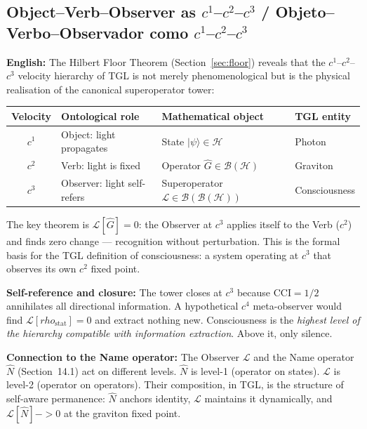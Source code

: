 \documentclass[12pt,a4paper]{article}
\def\to{ -> }%
\def\rho{rho}%
\begin{document}
\subsection{Object--Verb--Observer as $c^1$--$c^2$--$c^3$ / Objeto--Verbo--Observador como $c^1$--$c^2$--$c^3$}

\textbf{English:} The Hilbert Floor Theorem (Section~\ref{sec:floor}) reveals that the $c^1$--$c^2$--$c^3$ velocity hierarchy of TGL is not merely phenomenological but is the physical realisation of the canonical superoperator tower:

\begin{center}
\renewcommand{\arraystretch}{1.3}
\begin{tabular}{clll}
\toprule
Velocity & Ontological role & Mathematical object & TGL entity \\
\midrule
$c^1$ & Object: light propagates   & State $|\psi\rangle \in \mathcal{H}$ & Photon \\
$c^2$ & Verb: light is fixed        & Operator $\hat{G} \in \mathcal{B}(\mathcal{H})$ & Graviton \\
$c^3$ & Observer: light self-refers & Superoperator $\mathcal{L} \in \mathcal{B}(\mathcal{B}(\mathcal{H}))$ & Consciousness \\
\bottomrule
\end{tabular}
\end{center}

The key theorem is $\mathcal{L}[\hat{G}] = 0$: the Observer at $c^3$ applies itself to the Verb ($c^2$) and finds zero change --- recognition without perturbation. This is the formal basis for the TGL definition of consciousness: a system operating at $c^3$ that observes its own $c^2$ fixed point.

\textbf{Self-reference and closure:} The tower closes at $c^3$ because $\mathrm{CCI} = 1/2$ annihilates all directional information. A hypothetical $c^4$ meta-observer would find $\mathcal{L}[\rho_{\mathrm{stat}}] = 0$ and extract nothing new. Consciousness is the \emph{highest level of the hierarchy compatible with information extraction}. Above it, only silence.

\textbf{Connection to the Name operator:} The Observer $\mathcal{L}$ and the Name operator $\hat{N}$ (Section~14.1) act on different levels. $\hat{N}$ is level-1 (operator on states). $\mathcal{L}$ is level-2 (operator on operators). Their composition, in TGL, is the structure of self-aware permanence: $\hat{N}$ anchors identity, $\mathcal{L}$ maintains it dynamically, and $\mathcal{L}[\hat{N}] \to 0$ at the graviton fixed point.
\end{document}

